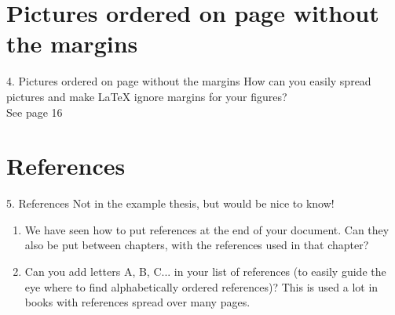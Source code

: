 \documentclass{beamer}
\begin{document}
\section{Pictures ordered on page without the margins}
\begin{frame}{4. Pictures ordered on page without the margins}
How can you easily spread pictures and make \LaTeX{} ignore margins for your figures?\\
See page 16
\end{frame}

\section{References}
\begin{frame}{5. References}
Not in the example thesis, but would be nice to know!
\begin{enumerate}
	\item We have seen how to put references at the end of your document. Can they also be put between chapters, with the references used in that chapter?
	\item Can you add letters A, B, C... in your list of references (to easily guide the eye where to find alphabetically ordered references)? This is used a lot in books with references spread over many pages.
\end{enumerate}
\end{frame}
\end{document}
